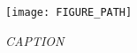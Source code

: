 \begin{figure} 
    \centering 
    \texttt{[image: FIGURE\_PATH]} 
    \caption{\it CAPTION} 
    \label{fig:FIGURE_BASENAME} 
\end{figure}